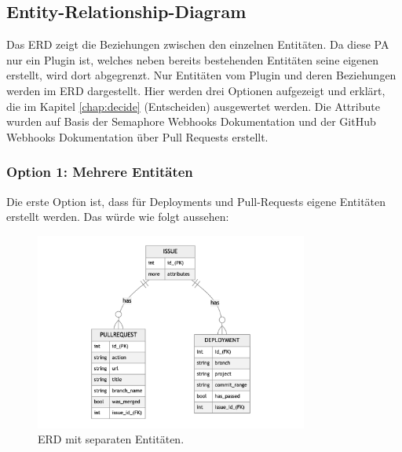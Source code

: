 \subsection{Entity-Relationship-Diagram}
Das ERD zeigt die Beziehungen zwischen den einzelnen Entitäten. Da diese PA nur ein Plugin ist, welches neben
bereits bestehenden Entitäten seine eigenen erstellt, wird dort abgegrenzt. Nur Entitäten vom Plugin und
deren Beziehungen werden im ERD dargestellt. \newline
Hier werden drei Optionen aufgezeigt und erklärt, die im Kapitel \ref{chap:decide} (Entscheiden) ausgewertet werden. \newline
Die Attribute wurden auf Basis der Semaphore Webhooks Dokumentation \cite{semaphore_webhooks} und der GitHub Webhooks
Dokumentation über Pull Requests \cite{github_webhooks_pr} erstellt.

\subsubsection{Option 1: Mehrere Entitäten}
Die erste Option ist, dass für Deployments und Pull-Requests eigene Entitäten erstellt werden. Das würde wie folgt aussehen:
\begin{figure}[H]
  \centering
  \includegraphics[width=0.8\textwidth]{images/erd/multiple.png}
  \caption[Ein ERD, welches eine separate Entität für Deployments und Pull-Requests aufzeigt.]{ERD mit separaten Entitäten.}
  \label{fig:erd_multiple}
\end{figure}

